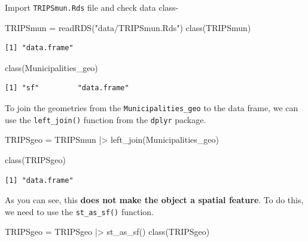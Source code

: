 \documentclass[
  letterpaper,
  DIV=11,
  numbers=noendperiod]{scrreprt}
\newenvironment{Shaded}{\begin{snugshade}}{\end{snugshade}}
\newcommand{\FunctionTok}[1]{\textcolor[rgb]{0.28,0.35,0.67}{#1}}
\newcommand{\NormalTok}[1]{\textcolor[rgb]{0.00,0.23,0.31}{#1}}
\newcommand{\OtherTok}[1]{\textcolor[rgb]{0.00,0.23,0.31}{#1}}
\newcommand{\SpecialCharTok}[1]{\textcolor[rgb]{0.37,0.37,0.37}{#1}}
\newcommand{\StringTok}[1]{\textcolor[rgb]{0.13,0.47,0.30}{#1}}
\begin{document}
Import \texttt{TRIPSmun.Rds} file and check data class-

\begin{Shaded}
\begin{Highlighting}[]
\NormalTok{TRIPSmun }\OtherTok{=} \FunctionTok{readRDS}\NormalTok{(}\StringTok{"data/TRIPSmun.Rds"}\NormalTok{)}
\FunctionTok{class}\NormalTok{(TRIPSmun)}
\end{Highlighting}
\end{Shaded}

\begin{verbatim}
[1] "data.frame"
\end{verbatim}

\begin{Shaded}
\begin{Highlighting}[]
\FunctionTok{class}\NormalTok{(Municipalities\_geo)}
\end{Highlighting}
\end{Shaded}

\begin{verbatim}
[1] "sf"         "data.frame"
\end{verbatim}

To join the geometries from the \texttt{Municipalities\_geo} to the data
frame, we can use the \texttt{left\_join()} function from the
\texttt{dplyr} package.

\begin{Shaded}
\begin{Highlighting}[]
\NormalTok{TRIPSgeo }\OtherTok{=}
\NormalTok{  TRIPSmun }\SpecialCharTok{|\textgreater{}} 
  \FunctionTok{left\_join}\NormalTok{(Municipalities\_geo)}

\FunctionTok{class}\NormalTok{(TRIPSgeo)}
\end{Highlighting}
\end{Shaded}

\begin{verbatim}
[1] "data.frame"
\end{verbatim}

As you can see, this \textbf{does not make the object a spatial
feature}. To do this, we need to use the \texttt{st\_as\_sf()} function.

\begin{Shaded}
\begin{Highlighting}[]
\NormalTok{TRIPSgeo }\OtherTok{=}\NormalTok{ TRIPSgeo }\SpecialCharTok{|\textgreater{}} \FunctionTok{st\_as\_sf}\NormalTok{()}
\FunctionTok{class}\NormalTok{(TRIPSgeo)}
\end{Highlighting}
\end{Shaded}
\end{document}
